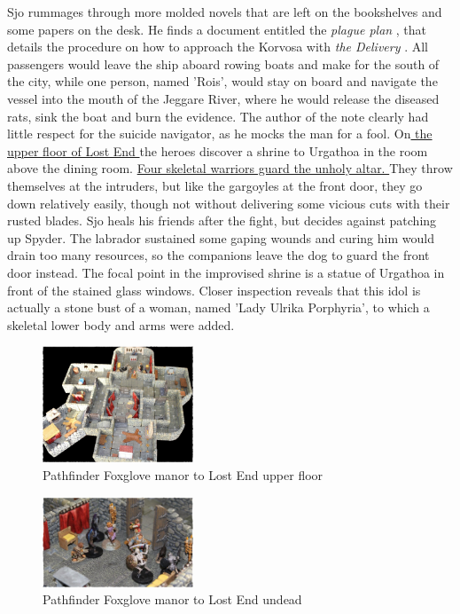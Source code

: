 Sjo rummages through more molded novels that are left on the bookshelves and some papers on the desk. He finds a document entitled the {\itshape plague plan} , that details the procedure on how to approach the Korvosa with  {\itshape the Delivery} . All passengers would leave the ship aboard rowing boats and make for the south of the city, while one person, named 'Rois', would stay on board and navigate the vessel into the mouth of the Jeggare River, where he would release the diseased rats, sink the boat and burn the evidence. The author of the note clearly had little respect for the suicide navigator, as he mocks the man for a fool. On\hyperref[fig:Pathfinder-Foxglove-manor-to-Lost-End-upper-floor-513924264]{ the upper floor of Lost End } the heroes discover a shrine to Urgathoa in the room above the dining room. \hyperref[fig:Pathfinder-Foxglove-manor-to-Lost-End-undead-513925444]{ Four skeletal warriors guard the unholy altar. } They throw themselves at the intruders, but like the gargoyles at the front door, they go down relatively easily, though not without delivering some vicious cuts with their rusted blades. Sjo heals his friends after the fight, but decides against patching up Spyder. The labrador sustained some gaping wounds and curing him would drain too many resources, so the companions leave the dog to guard the front door instead. The focal point in the improvised shrine is a statue of Urgathoa in front of the stained glass windows. Closer inspection reveals that this idol is actually a stone bust of a woman, named 'Lady Ulrika Porphyria', to which a skeletal lower body and arms were added. \\

\begin{figure}[h]
	\centering
	\includegraphics[width=0.4\textwidth]{images/Pathfinder-Foxglove-manor-to-Lost-End-upper-floor-513924264_mod.jpg}
	\caption{Pathfinder Foxglove manor to Lost End upper floor}
	\label{fig:Pathfinder-Foxglove-manor-to-Lost-End-upper-floor-513924264}
\end{figure}

\begin{figure}[h]
	\centering
	\includegraphics[width=0.4\textwidth]{images/Pathfinder-Foxglove-manor-to-Lost-End-undead-513925444_mod.jpg}
	\caption{Pathfinder Foxglove manor to Lost End undead}
	\label{fig:Pathfinder-Foxglove-manor-to-Lost-End-undead-513925444}
\end{figure}

